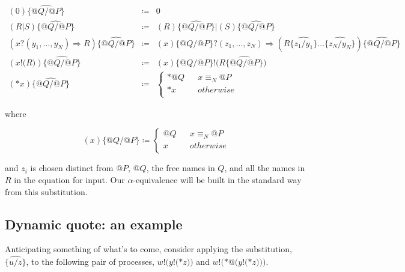 \documentclass[]{amsart}
\makeatletter
\newcommand{\id}[1]{\texttt{#1}}
\newcommand{\juxtap}{\mathbin{\id{|}}}
\newcommand{\nameeq}{\mathbin{\equiv_N}}
\newcommand{\quotep}[1]{@#1}
\newcommand{\dropn}[1]{*#1}
\newcommand{\substp}[2]{\id{\{} \quotep{#1} / \quotep{#2} \id{\}}}
\newcommand{\substn}[2]{\id{\{} #1 / #2 \id{\}}}
\newcommand{\psubstp}[2]{\widehat{\substp{#1}{#2}}}
\newcommand{\psubstn}[2]{\widehat{\substn{#1}{#2}}}
\newcommand{\defneqls}{\coloneqq}
\theoremstyle{definition}
\theoremstyle{remark}
\numberwithin{equation}{subsection}
\makeatother
\begin{document}
\begin{eqnarray*}
(0) \psubstp{Q}{P}         & \defneqls &    0 \\
(R \juxtap S) \psubstp{Q}{P}
		& \defneqls &    
		(R)\psubstp{Q}{P} \juxtap (S) \psubstp{Q}{P} \\
({x}{?}{( y_1, \ldots, y_N )} \Rightarrow R) \psubstp{Q}{P}    
		& \defneqls &    
		{(x)}\substp{Q}{P}{?}{( z_1, \ldots, z_N )}\Rightarrow (R \psubstn{z_1}{y_1}\ldots\psubstn{z_N}{y_N}) \psubstp{Q}{P} \\
({x}{!}{(}{R}{)}) \psubstp{Q}{P}  
 		& \defneqls &
 		{(x)\substp{Q}{P}}{!}{(}{ R \psubstp{Q}{P} }{)} \\
({*}{x})  \psubstp{Q}{P}       
		& \defneqls & 
		\left\{ 
			\begin{array}{ccc} 
				\dropn{\quotep{Q}} & & x \nameeq \quotep{P} \\
                              	\dropn{x} & & otherwise \\
			\end{array}
		\right.
\end{eqnarray*}
 

where

\begin{equation*}
(x){\{} {@}Q / {@}P {\}}            \defneqls 
		\left\{ 
			\begin{array}{ccc}
				{@}Q & & x \nameeq {@}P \\
                                x & & otherwise \\
			\end{array}
		\right.
\end{equation*}

and $z_i$ is chosen distinct from $\quotep{P}$, $\quotep{Q}$, the free
names in $Q$, and all the names in $R$ in the equation for input. Our
$\alpha$-equivalence will be built in the standard way from this
substitution.

\subsection{ Dynamic quote: an example }

Anticipating something of what's to come, consider applying the
substitution, $\widehat{{\{}u / z {\}}}$, to the following pair
of processes, ${w}{!}{(}{y}{!}{(}{*}{z}{)}{)}$ and ${w}{!}{(}{*}{@}({y}{!}{(}{*z}{)}{)}{)}$.
\end{document}
